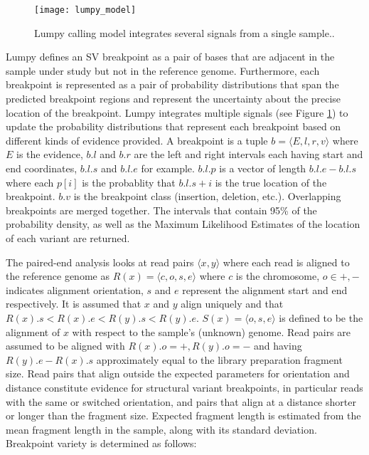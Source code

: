 \begin{figure}[H]
    \texttt{[image: lumpy\_model]}
    \centering
    \caption {Lumpy calling model integrates several signals from a single sample.\autocite{layer2014lumpy}.}
    \label{fig:lumpy_model}
\end{figure}

Lumpy defines an SV breakpoint as a pair of bases that are adjacent in the sample under study but not in the reference genome. Furthermore, each breakpoint is represented as a pair of probability distributions that span the predicted breakpoint regions and represent the uncertainty about the precise location of the breakpoint. Lumpy integrates multiple signals (see Figure \ref{fig:lumpy_model}) to update the probability distributions that represent each breakpoint based on different kinds of evidence provided. A breakpoint is a tuple $b = \langle E,l,r,v \rangle$ where $E$ is the evidence, $b.l$ and $b.r$ are the left and right intervals each having start and end coordinates, $b.l.s$ and $b.l.e$ for example. $b.l.p$ is a vector of length $b.l.e - b.l.s$ where each $p[i]$ is the probablity that $b.l.s + i$ is the true location of the breakpoint. $b.v$ is the breakpoint class (insertion, deletion, etc.). Overlapping breakpoints are merged together. The intervals that contain 95\% of the probability density, as well as the Maximum Likelihood Estimates of the location of each variant are returned. 

The paired-end analysis looks at read pairs $\langle x, y\rangle$ where each read is aligned to the reference genome as $R(x) = \langle c, o, s, e \rangle$ where $c$ is the chromosome, $o \in {+,-}$ indicates alignment orientation, $s$ and $e$ represent the alignment start and end respectively. It is assumed that $x$ and $y$ align uniquely and that $R(x).s < R(x).e < R(y).s < R(y).e$. $S(x) = \langle o, s, e \rangle$ is defined to be the alignment of $x$ with respect to the sample's (unknown) genome. Read pairs are assumed to be aligned with $R(x).o = +, R(y).o = -$ and having $R(y).e - R(x).s$ approximately equal to the library preparation fragment size. Read pairs that align outside the expected parameters for orientation and distance constitute evidence for structural variant breakpoints, in particular reads with the same or switched orientation, and pairs that align at a distance shorter or longer than the fragment size. Expected fragment length is estimated from the mean fragment length in the sample, along with its standard deviation. Breakpoint variety is determined as follows:

